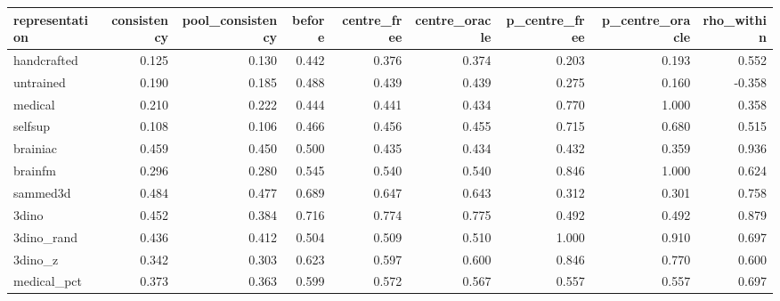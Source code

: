 \begin{tabular}{lrrrrrrrr}
\toprule
representation & consistency & pool\_consistency & before & centre\_free & centre\_oracle & p\_centre\_free & p\_centre\_oracle & rho\_within \\
\midrule
handcrafted & 0.125 & 0.130 & 0.442 & 0.376 & 0.374 & 0.203 & 0.193 & 0.552 \\
untrained & 0.190 & 0.185 & 0.488 & 0.439 & 0.439 & 0.275 & 0.160 & -0.358 \\
medical & 0.210 & 0.222 & 0.444 & 0.441 & 0.434 & 0.770 & 1.000 & 0.358 \\
selfsup & 0.108 & 0.106 & 0.466 & 0.456 & 0.455 & 0.715 & 0.680 & 0.515 \\
brainiac & 0.459 & 0.450 & 0.500 & 0.435 & 0.434 & 0.432 & 0.359 & 0.936 \\
brainfm & 0.296 & 0.280 & 0.545 & 0.540 & 0.540 & 0.846 & 1.000 & 0.624 \\
sammed3d & 0.484 & 0.477 & 0.689 & 0.647 & 0.643 & 0.312 & 0.301 & 0.758 \\
3dino & 0.452 & 0.384 & 0.716 & 0.774 & 0.775 & 0.492 & 0.492 & 0.879 \\
3dino\_rand & 0.436 & 0.412 & 0.504 & 0.509 & 0.510 & 1.000 & 0.910 & 0.697 \\
3dino\_z & 0.342 & 0.303 & 0.623 & 0.597 & 0.600 & 0.846 & 0.770 & 0.600 \\
medical\_pct & 0.373 & 0.363 & 0.599 & 0.572 & 0.567 & 0.557 & 0.557 & 0.697 \\
\bottomrule
\end{tabular}
